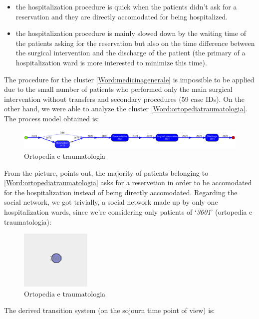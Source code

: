 \begin{itemize}
\item the hospitalization procedure is quick when the patients didn't ask for a reservation and they are directly accomodated for being hospitalized.
\item the hospitalization procedure is mainly slowed down by the waiting time of the patients asking for the reservation but also on the time difference between the surgical intervention and the discharge of the patient (the primary of a hospitalization ward is more interested to minimize this time).
\end{itemize}
The procedure for the cluster \ref{Word:medicinagenerale} is impossible to be applied due to the small number of patients who performed only the main surgical intervention without transfers and secondary procedures (59 case IDs). On the other hand, we were able to analyze the cluster \ref{Word:ortopediatraumatologia}. The process model obtained is:
\begin{figure} [htbp]
\includegraphics[width=\textwidth , keepaspectratio]{RicoveriInductiveVisualMiner3601}
\caption{Ortopedia e traumatologia}
\end{figure}
\newline
From the picture, points out, the majority of patients belonging to \ref{Word:ortopediatraumatologia} asks for a reservetion in order to be accomodated for the hospitalization instead of being directly accomodated. Regarding the social network, we got trivially, a social network made up by only one hospitalization wards, since we're considering only patients of `\textit{3601}' (ortopedia e traumatologia): 
\begin{figure} [htbp]
\includegraphics[width=0.3\textwidth , keepaspectratio]{RicoveriSocialNetwork3601}
\caption{Ortopedia e traumatologia}
\end{figure}
\clearpage
\noindent
The derived transition system (on the sojourn time point of view) is:

